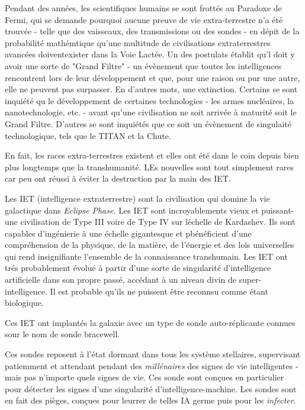Pendant des années, les scientifiques humains se sont frottés au Paradoxe de Fermi, qui se demande pourquoi aucune preuve de vie extra-terrestre n'a été trouvée - telle que des vaisseaux, des transmissions ou des sondes - en dépit de la probabilité mathémtique qu'une multitude de civilisations extraterrestres avancées doiventexister dans la Voie Lactée. Un des postulats établit qu'l doit y avoir une sorte de "Grand Filtre" - un évènement que toutes les intelligences rencontrent lors de leur développement et que, pour une raison ou pur une autre, elle ne peuvent pas surpasser. En d'autres mots, une extinction. Certains se sont inquiété qu le développement de certaines technologies - les armes nucléaires, la nanotechnologie, etc. - avant qu'une civilisation ne soit arrivée à maturité soit le Grand Filtre. D'autres se sont inquiétés que ce soit un évènement de singulaité technologique, tels que le TITAN et la Chute. 

En fait, les races extra-terrestres existent et elles ont été dans le coin depuis bien plus longtemps que la transhumanité. LEs nouvelles sont tout simplement rares car peu ont réussi à éviter la destruction par la main des IET. 

Les IET (intelligence extraterrestre) sont la civilisation qui domine la vie galactique dans \textit{Eclipse Phase.} Les IET sont incroyablements vieux et puissant- une civilisation de Type III voire de Type IV sur léchelle de Kardashev. Ils sont capables d'ingénierie à une échelle gigantesque et pbénéficient d'une compréhension de la physique, de la matière, de l'énergie et des lois universelles qui rend insignifiante l'ensemble de la connaissance transhumain. Les IET ont trés probablement évolué à partir d'une sorte de singularité d'intelligence artificielle dans son propre passé, accédant à un niveau divin de super-intelligence. Il est probable qu'ils ne puissent être reconnsu comme étant biologique. 

Ces IET ont implantés la galaxie avec un type de sonde auto-réplicante connues sour le nom de sonde bracewell. 

Ces sondes reposent à l'état dormant dans tous les système stellaires, supervisant patiemment et attendant pendant des \textit{millénaires} des signes de vie intelligentes - mais pas n'importe quels signes de vie. Ces sonde sont conçues en particulier pour détecter les signes d'une singularité d'intelligence-machine. Les sondes sont en fait des pièges, conçues pour leurrer de telles IA germe puis pour les \textit{infecter}. 

